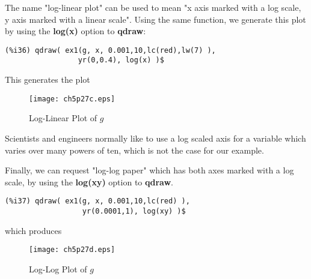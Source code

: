 \documentclass[12pt]{article}
\begin{document}
\newpage
The name "log-linear plot" can be used to mean "x axis marked with a log scale, y axis
  marked with a linear scale".
Using the same function, we generate this plot by using the \textbf{log(x)}
  option to \textbf{qdraw}:
\small
\begin{verbatim}
(%i36) qdraw( ex1(g, x, 0.001,10,lc(red),lw(7) ),
                 yr(0,0.4), log(x) )$
\end{verbatim}
\normalsize
%  
This generates the plot
\begin{figure} [h]
   \centerline{\texttt{[image: ch5p27c.eps]} }
	\caption{Log-Linear Plot of $g$}
\end{figure}      

\smallskip
Scientists and engineers normally like to use a log scaled axis for
  a variable which varies over many powers of ten, which is not the case
  for our example.

\smallskip

Finally, we can request "log-log paper" which has both axes marked with a log scale,
  by using the \textbf{log(xy)} option to \textbf{qdraw}.
\small
\begin{verbatim}
(%i37) qdraw( ex1(g, x, 0.001,10,lc(red) ),
                  yr(0.0001,1), log(xy) )$
\end{verbatim}
\normalsize
%
which produces
\begin{figure} [h]
   \centerline{\texttt{[image: ch5p27d.eps]} }
	\caption{Log-Log Plot of $g$}
\end{figure}      

\newpage
\end{document}
